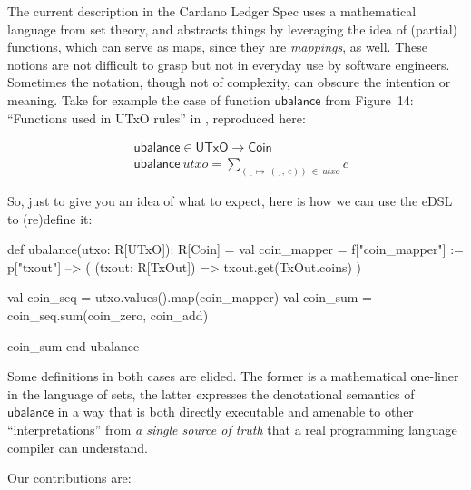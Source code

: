 \documentclass[11pt]{article}
\newcommand{\uempty}[1][x]{\underline{\phantom{#1}}}
\begin{document}
The current description in the Cardano Ledger Spec uses a mathematical 
language from set theory, and abstracts things by leveraging the idea of 
(partial) functions, which can serve as maps, since  they are 
\textit{mappings}, as well. These notions are not difficult to grasp but not 
in everyday use by software engineers. Sometimes the notation, though not of 
complexity, can obscure the intention or meaning. Take for example the case 
of function $\mathsf{ubalance}$ from Figure~14: ``Functions used in UTxO 
rules'' in \cite{cardano:ledger-spec:shelley:2019}, reproduced here:
  
\begin{align*}
  & \mathsf{ubalance} \in \mathsf{UTxO} \to \mathsf{Coin} \\
  & \mathsf{ubalance} ~ \textit{utxo} = \sum_{(\uempty  \mapsto ~ (\uempty, ~c)) ~ \in ~ \textit{utxo}} c
\end{align*}

\noindent So, just to give you an idea of what to expect, here is how we can use the eDSL to (re)define it:

\begin{ScalaBlockSimple}
def ubalance(utxo: R[UTxO]): R[Coin] =
  val coin_mapper = f["coin_mapper"] :=
    p["txout"] --> ( (txout: R[TxOut]) => txout.get(TxOut.coins) )

  val coin_seq  = utxo.values().map(coin_mapper)
  val coin_sum  = coin_seq.sum(coin_zero, coin_add)

  coin_sum
end ubalance
\end{ScalaBlockSimple}

\noindent Some definitions in both cases are elided. The former is a 
mathematical one-liner in the language of sets, the latter expresses the 
denotational semantics of $\mathsf{ubalance}$ in a way that is both directly 
executable and amenable to other ``interpretations'' from \textit{a single 
source of truth} that a real programming language compiler can understand.

Our contributions are:
\end{document}

